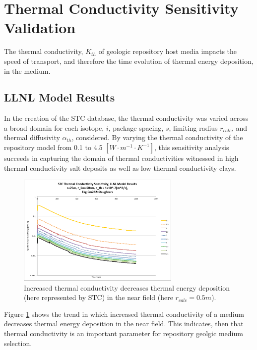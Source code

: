 \section{Thermal Conductivity Sensitivity Validation}\label{sec:conductivity}
The thermal conductivity, $K_{th}$ of geologic repository host media impacts 
the speed of transport, and therefore the time evolution of thermal energy 
deposition, in the medium. 

\FloatBarrier
\subsection{LLNL Model Results}
In the creation of the \gls{STC} database, the thermal conductivity was varied 
across a broad domain for each isotope, $i$, package spacing, $s$, limiting 
radius $r_{calc}$, and thermal diffusivity $\alpha_{th}$, considered.  By 
varying the thermal conductivity of the repository model from 0.1 to 4.5
$[W\cdot m^{-1} \cdot K^{-1}]$, this sensitivity analysis succeeds in capturing the domain of 
thermal conductivities witnessed in high thermal conductivity salt deposits as 
well as low thermal conductivity clays.

\begin{figure}[htbp!]
\begin{center}
\includegraphics[width=0.7\textwidth]{./chapters/demonstration/conductivity/Cm242kth_alpha_low.eps}
\end{center}
\caption[$K_{th}$ Sensitivity for Low $\alpha_{th}$ in LLNL Model]{Increased thermal conductivity decreases thermal energy deposition 
(here represented by \gls{STC}) in the near field (here $r_{calc} = 0.5m$).}
\label{fig:Cm242Kth_alpha_low}
\end{figure}

Figure \ref{fig:Cm242Kth_alpha_low} shows the trend in which increased thermal conductivity of a medium decreases thermal energy 
deposition in the near field. This indicates, then that thermal conductivity is 
an important parameter for repository geolgic medium selection. 

